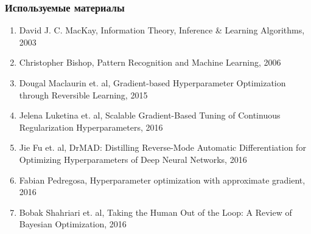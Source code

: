 \documentclass[10pt,pdf,utf8,russian,aspectratio=169]{beamer}
\begin{document}
\begin{frame}
\frametitle{Используемые материалы}
\begin{enumerate}
\item David J. C. MacKay, Information Theory, Inference \& Learning Algorithms, 2003
\item Christopher Bishop, Pattern Recognition and Machine Learning, 2006
\item  Dougal Maclaurin et. al, Gradient-based Hyperparameter Optimization through Reversible Learning, 2015
\item Jelena Luketina et. al, Scalable Gradient-Based Tuning of
Continuous Regularization Hyperparameters, 2016
\item Jie Fu et. al, DrMAD: Distilling Reverse-Mode Automatic Differentiation for Optimizing
Hyperparameters of Deep Neural Networks, 2016
\item Fabian Pedregosa, Hyperparameter optimization with approximate gradient, 2016
\item Bobak Shahriari et. al,  Taking the Human Out of the Loop:
A Review of Bayesian Optimization, 2016
\end{enumerate}
\end{frame}
\end{document}
